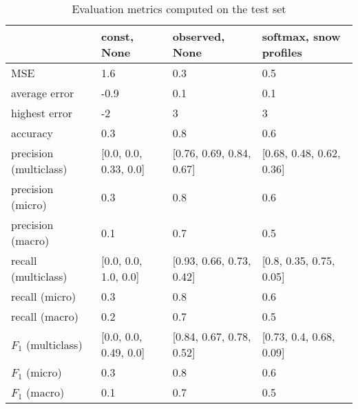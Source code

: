 \begin{table}[H]
\caption{Evaluation metrics computed on the test set}
\label{tbl:sais_eval_test}
\begin{tabular}{llll}
\toprule
 & const, None & observed, None & softmax, snow profiles \\
\midrule
MSE & 1.6 & 0.3 & 0.5 \\
average error & -0.9 & 0.1 & 0.1 \\
highest error & -2 & 3 & 3 \\
accuracy & 0.3 & 0.8 & 0.6 \\
precision (multiclass) & [0.0, 0.0, 0.33, 0.0] & [0.76, 0.69, 0.84, 0.67] & [0.68, 0.48, 0.62, 0.36] \\
precision (micro) & 0.3 & 0.8 & 0.6 \\
precision (macro) & 0.1 & 0.7 & 0.5 \\
recall (multiclass) & [0.0, 0.0, 1.0, 0.0] & [0.93, 0.66, 0.73, 0.42] & [0.8, 0.35, 0.75, 0.05] \\
recall (micro) & 0.3 & 0.8 & 0.6 \\
recall (macro) & 0.2 & 0.7 & 0.5 \\
$F_1$ (multiclass) & [0.0, 0.0, 0.49, 0.0] & [0.84, 0.67, 0.78, 0.52] & [0.73, 0.4, 0.68, 0.09] \\
$F_1$ (micro) & 0.3 & 0.8 & 0.6 \\
$F_1$ (macro) & 0.1 & 0.7 & 0.5 \\
\bottomrule
\end{tabular}
\end{table}
